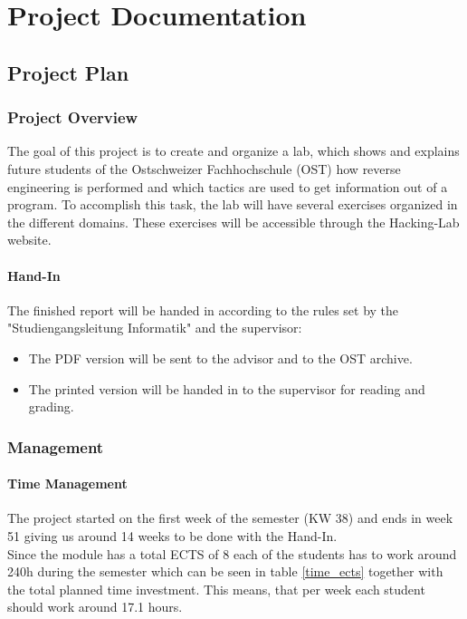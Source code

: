 \chapter{Project Documentation}
\section{Project Plan}
\subsection{Project Overview}
The goal of this project is to create and organize a lab, which shows and explains future students of the Ostschweizer Fachhochschule (OST) how reverse engineering is performed and which tactics are used to get information out of a program. To accomplish this task, the lab will have several exercises organized in the different domains. These exercises will be accessible through the Hacking-Lab website. 

\subsubsection*{Hand-In}
The finished report will be handed in according to the rules set by the "Studiengangsleitung Informatik" and the supervisor:
\begin{itemize}
    \item The PDF version will be sent to the advisor and to the OST archive.
    \item The printed version will be handed in to the supervisor for reading and grading.
\end{itemize}

\subsection{Management}
\subsubsection*{Time Management}
The project started on the first week of the semester (KW 38) and ends in week 51 giving us around 14 weeks to be done with the Hand-In. \\
Since the module has a total ECTS of 8 each of the students has to work around 240h during the semester which can be seen in table \ref{time_ects} together with the total planned time investment. This means, that per week each student should work around 17.1 hours.

